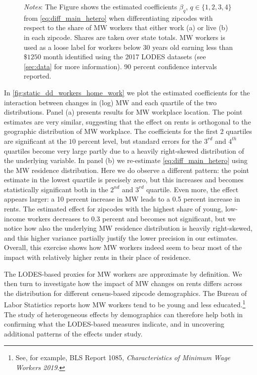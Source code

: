 \begin{figure}[h!]
\begin{minipage}{0.95\textwidth}
		\vspace{2mm} 
		\textit{Notes}: The Figure shows the estimated coefficients $\beta_{q}$, $q \in \{1, 2, 3,
		4\}$ from \autoref{eq:diff_main_hetero} when differentiating zipcodes with respect to the 
		share of MW workers that either work (a) or live (b) in each zipcode. Shares are taken over 
		state totals. MW workers is used as a loose label for workers below 30 years old earning 
		less than $\$1250$ month identified using the 2017 LODES datasets (see \autoref{sec:data} 
		for more information). 90 percent confidence intervals reported.
	\end{minipage}
\end{figure}

In \autoref{fig:static_dd_workers_home_work} we plot the estimated coefficients for the interaction 
between changes in (log) MW and each quartile of the two distributions. Panel (a) presents results 
for MW workplace location. The point estimates are very similar, suggesting that the effect on rents 
is orthogonal to the geographic distribution of MW workplace. The coefficients for the first 2 
quartiles are significant at the $10$ percent level, but standard errors for the $3^{rd}$ and 
$4^{th}$ quartiles become very large partly due to a heavily right-skewed distribution of the 
underlying variable. In panel (b) we re-estimate \autoref{eq:diff_main_hetero} using the MW residence 
distribution. Here we do observe a different pattern: the point estimate in the lowest quartile is 
precisely zero, but this increases and becomes statistically significant both in the $2^{nd}$ and 
$3^{rd}$ quartile. Even more, the effect appears larger: a 10 percent increase in MW leads to a 0.5 
percent increase in rents. The estimated effect for zipcodes with the highest share of young, 
low-income workers decreases to 0.3 percent and becomes not significant, but we notice how also the 
underlying MW residence distribution is heavily right-skewed, and this higher variance partially 
justify the lower precision in our estimates. Overall, this exercise shows how MW workers indeed seem 
to bear most of the impact with relatively higher rents in their place of residence.

The LODES-based proxies for MW workers are approximate by definition. We then turn to investigate 
how the impact of MW changes on rents differs across the distribution for different census-based 
zipcode demographics. The Bureau of Labor Statistics reports how MW workers tend to be young and 
less educated.\footnote{See, for example, BLS Report 1085, \textit{Characteristics of Minimum Wage 
		Workers 2019}.} %
The study of heterogeneous effects by demographics can therefore help both in confirming what the
LODES-based measures indicate, and in uncovering additional patterns of the effects under study.

